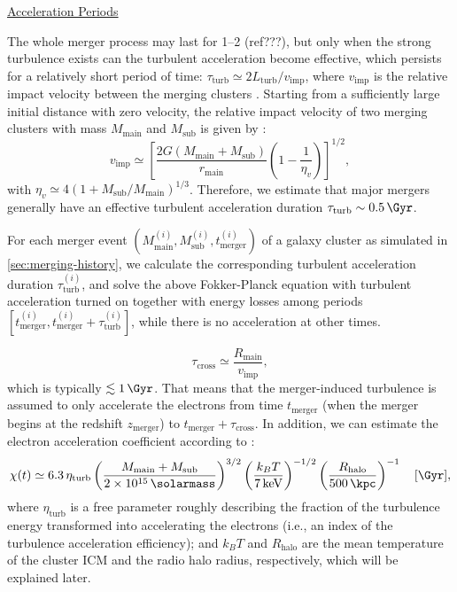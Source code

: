 \documentclass[modern]{aastex61}
\newcommand{\R}[1]{\mathrm{#1}}
\begin{document}
\vspace{1ex}
\noindent\uline{Acceleration Periods}

The whole merger process may last for \SIrange{1}{2}{\Gyr} (ref???),
but only when the strong turbulence exists can the turbulent acceleration
become effective, which persists for a relatively short period of time:
$\tau_{\R{turb}} \simeq 2 L_{\R{turb}} / v_{\R{imp}}$,
where $v_{\R{imp}}$ is the relative impact velocity between the merging
clusters \citep{miniati2015}.
Starting from a sufficiently large initial distance with zero velocity,
the relative impact velocity of two merging clusters with mass
$M_{\R{main}}$ and $M_{\R{sub}}$ is given by \citep{sarazin2002,cassano2005}:
\begin{equation}
  \label{eq:v-imp}
  v_{\R{imp}} \simeq \left[
    \frac{2G (M_{\R{main}} + M_{\R{sub}})}{r_{\R{main}}}
    \left( 1 - \frac{1}{\eta_v} \right)\right]^{1/2},
\end{equation}
with $\eta_v \simeq 4 (1 + M_{\R{sub}}/M_{\R{main}})^{1/3}$.
Therefore, we estimate that major mergers generally have an effective
turbulent acceleration duration $\tau_{\R{turb}} \sim \SI{0.5}{\Gyr}$.

For each merger event
$(M^{(i)}_{\R{main}}, M^{(i)}_{\R{sub}}, t^{(i)}_{\R{merger}})$
of a galaxy cluster as simulated in \autoref{sec:merging-history},
we calculate the corresponding turbulent acceleration duration
$\tau^{(i)}_{\R{turb}}$, and solve the above Fokker-Planck equation with
turbulent acceleration turned on together with energy losses among
periods $[t^{(i)}_{\R{merger}}, t^{(i)}_{\R{merger}}+\tau^{(i)}_{\R{turb}}]$,
while there is no acceleration at other times.

\begin{equation}
  \label{eq:tau-cross}
  \tau_{\R{cross}} \simeq \frac{R_{\R{main}}}{v_{\R{imp}}},
\end{equation}
which is typically $\lesssim \SI{1}{\Gyr}$.
That means that the merger-induced turbulence is assumed to only accelerate
the electrons from time $t_{\R{merger}}$ (when the merger begins at the
redshift $z_{\R{merger}}$) to $t_{\R{merger}} + \tau_{\R{cross}}$.
In addition, we can estimate the electron acceleration coefficient
according to \citep{cassano2005}:
\begin{equation}
  \label{eq:electron-acc}
  \chi(t) \simeq 6.3 \,\eta_{\R{turb}}
      \left( \frac{M_{\R{main}} + M_{\R{sub}}}{\SI{2e15}{\solarmass}} \right)^{3/2}
      \left( \frac{k_BT}{\SI{7}{\keV}} \right)^{-1/2}
      \left( \frac{R_{\R{halo}}}{\SI{500}{\kpc}} \right)^{-1}
  \quad [\si{\per\Gyr}],
\end{equation}
where $\eta_{\R{turb}}$ is a free parameter roughly describing the fraction
of the turbulence energy transformed into accelerating the electrons (i.e.,
an index of the turbulence acceleration efficiency);
and $k_BT$ and $R_{\R{halo}}$ are the mean temperature of the cluster ICM
and the radio halo radius, respectively, which will be explained later.
\end{document}
